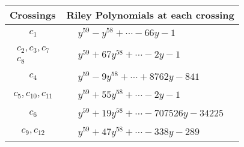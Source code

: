 \documentclass[1p]{elsarticle_modified}
\theoremstyle{definition}
\begin{document}
\begin{tabular}{m{50pt}|m{274pt}}
Crossings & \hspace{64pt}Riley Polynomials at each crossing \\
\hline $$\begin{aligned}c_{1}\end{aligned}$$&$\begin{aligned}
&y^{59}- y^{58}+\cdots-66 y-1
\end{aligned}$\\
\hline $$\begin{aligned}c_{2},c_{3},c_{7}\\c_{8}\end{aligned}$$&$\begin{aligned}
&y^{59}+67 y^{58}+\cdots-2 y-1
\end{aligned}$\\
\hline $$\begin{aligned}c_{4}\end{aligned}$$&$\begin{aligned}
&y^{59}-9 y^{58}+\cdots+8762 y-841
\end{aligned}$\\
\hline $$\begin{aligned}c_{5},c_{10},c_{11}\end{aligned}$$&$\begin{aligned}
&y^{59}+55 y^{58}+\cdots-2 y-1
\end{aligned}$\\
\hline $$\begin{aligned}c_{6}\end{aligned}$$&$\begin{aligned}
&y^{59}+19 y^{58}+\cdots-707526 y-34225
\end{aligned}$\\
\hline $$\begin{aligned}c_{9},c_{12}\end{aligned}$$&$\begin{aligned}
&y^{59}+47 y^{58}+\cdots-338 y-289
\end{aligned}$\\
\hline
\end{tabular}
\vskip 2pc
\end{document}
